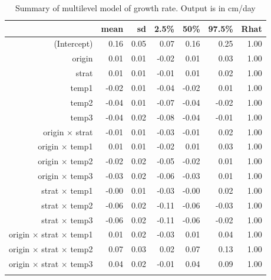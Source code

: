 \documentclass[12pt]{article}\usepackage[]{graphicx}\usepackage[]{color}
\begin{document}
\begin{longtable}{rrrrrrr}
\caption{Summary of multilevel model of growth rate.  Output is in cm/day} \\ 
  & mean & sd & 2.5\% & 50\% & 97.5\% & Rhat \\ 
  \hline
(Intercept) & 0.16 & 0.05 & 0.07 & 0.16 & 0.25 & 1.00 \\ 
  origin & 0.01 & 0.01 & -0.02 & 0.01 & 0.03 & 1.00 \\ 
  strat & 0.01 & 0.01 & -0.01 & 0.01 & 0.02 & 1.00 \\ 
  temp1 & -0.02 & 0.01 & -0.04 & -0.02 & 0.01 & 1.00 \\ 
  temp2 & -0.04 & 0.01 & -0.07 & -0.04 & -0.02 & 1.00 \\ 
  temp3 & -0.04 & 0.02 & -0.08 & -0.04 & -0.01 & 1.00 \\ 
  origin $\times$ strat & -0.01 & 0.01 & -0.03 & -0.01 & 0.02 & 1.00 \\ 
  origin $\times$ temp1 & 0.01 & 0.01 & -0.02 & 0.01 & 0.03 & 1.00 \\ 
  origin $\times$ temp2 & -0.02 & 0.02 & -0.05 & -0.02 & 0.01 & 1.00 \\ 
  origin $\times$ temp3 & -0.03 & 0.02 & -0.06 & -0.03 & 0.01 & 1.00 \\ 
  strat $\times$ temp1 & -0.00 & 0.01 & -0.03 & -0.00 & 0.02 & 1.00 \\ 
  strat $\times$ temp2 & -0.06 & 0.02 & -0.11 & -0.06 & -0.03 & 1.00 \\ 
  strat $\times$ temp3 & -0.06 & 0.02 & -0.11 & -0.06 & -0.02 & 1.00 \\ 
  origin $\times$ strat $\times$ temp1 & 0.01 & 0.02 & -0.03 & 0.01 & 0.04 & 1.00 \\ 
  origin $\times$ strat $\times$ temp2 & 0.07 & 0.03 & 0.02 & 0.07 & 0.13 & 1.00 \\ 
  origin $\times$ strat $\times$ temp3 & 0.04 & 0.02 & -0.01 & 0.04 & 0.09 & 1.00 \\ 
  \hline
\label{tab:mod_gr}
\end{longtable}
\end{document}
